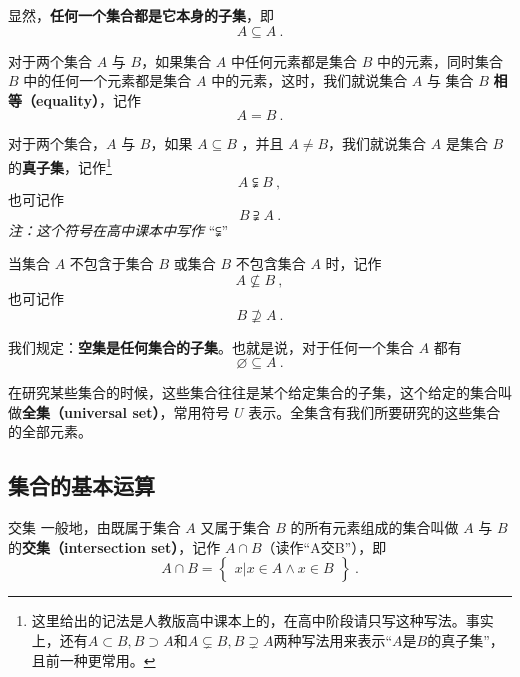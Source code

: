 显然，\textbf{任何一个集合都是它本身的子集}，即
\begin{equation}
A \subseteq A~.
\end{equation}

对于两个集合 $A$ 与 $B$，如果集合 $A$ 中任何元素都是集合 $B$ 中的元素，同时集合 $B$ 中的任何一个元素都是集合 $A$ 中的元素，这时，我们就说集合 $A$ 与 集合 $B$ \textbf{相等（equality）}，记作
\begin{equation}
A=B~.
\end{equation}

对于两个集合，$A$ 与 $B$，如果 $A\subseteq B$ ，并且 $A \ne B$，我们就说集合 $A$ 是集合 $B$ 的\textbf{真子集}，记作\footnote{这里给出的记法是人教版高中课本上的，在高中阶段请只写这种写法。事实上，还有$A\subset B,B\supset A$和$A\subsetneq B,B\supsetneq A$两种写法用来表示“$A$是$B$的真子集”，且前一种更常用。}
\begin{equation}
A \subsetneqq B~,
\end{equation}
也可记作
\begin{equation}
B \supsetneqq A~.
\end{equation}
\textsl{注：这个符号在高中课本中写作} “⫋”

当集合 $A$ 不包含于集合 $B$ 或集合 $B$ 不包含集合 $A$ 时，记作
\begin{equation}
A \nsubseteq B~,
\end{equation}
也可记作
\begin{equation}
B \nsupseteq A~.
\end{equation}

我们规定：\textbf{空集是任何集合的子集}。也就是说，对于任何一个集合 $A$ 都有
\begin{equation}
\varnothing \subseteq A~.
\end{equation}

在研究某些集合的时候，这些集合往往是某个给定集合的子集，这个给定的集合叫做\textbf{全集（universal set）}，常用符号 $U$ 表示。全集含有我们所要研究的这些集合的全部元素。

\subsection{集合的基本运算}
\begin{definition}{交集}
一般地，由既属于集合 $A$ 又属于集合 $B$ 的所有元素组成的集合叫做 $A$ 与 $B$ 的\textbf{交集（intersection set）}，记作 $A \cap B$（读作“A交B”），即
\begin{equation}
A\cap B = \begin{Bmatrix} x|x\in A \wedge x\in B \end{Bmatrix}~.
\end{equation}
\end{definition}


